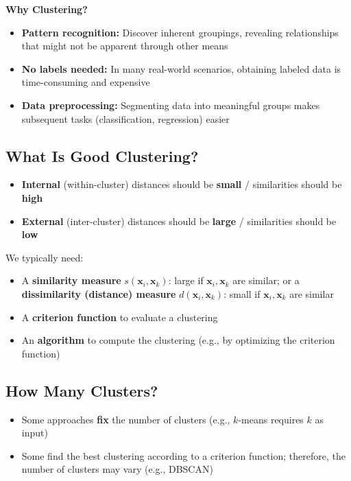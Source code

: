 \documentclass[11pt,a4paper]{article}
\theoremstyle{definition}
\theoremstyle{plain}
\theoremstyle{remark}
\begin{document}
\textbf{Why Clustering?}
\begin{itemize}
    \item \textbf{Pattern recognition:} Discover inherent groupings, revealing relationships that might not be apparent through other means
    \item \textbf{No labels needed:} In many real-world scenarios, obtaining labeled data is time-consuming and expensive
    \item \textbf{Data preprocessing:} Segmenting data into meaningful groups makes subsequent tasks (classification, regression) easier
\end{itemize}

\subsection{What Is Good Clustering?}

\begin{tcolorbox}[colback=green!5!white,colframe=green!75!black,title=\textbf{Good Clustering Criteria}]
\begin{itemize}
    \item \textbf{Internal} (within-cluster) distances should be \textbf{small} / similarities should be \textbf{high}
    \item \textbf{External} (inter-cluster) distances should be \textbf{large} / similarities should be \textbf{low}
\end{itemize}
We typically need:
\begin{itemize}
    \item A \textbf{similarity measure} $s(\mathbf{x}_i, \mathbf{x}_k)$: large if $\mathbf{x}_i, \mathbf{x}_k$ are similar; or a \textbf{dissimilarity (distance) measure} $d(\mathbf{x}_i, \mathbf{x}_k)$: small if $\mathbf{x}_i, \mathbf{x}_k$ are similar
    \item A \textbf{criterion function} to evaluate a clustering
    \item An \textbf{algorithm} to compute the clustering (e.g., by optimizing the criterion function)
\end{itemize}
\end{tcolorbox}

\subsection{How Many Clusters?}

\begin{itemize}
    \item Some approaches \textbf{fix} the number of clusters (e.g., $k$-means requires $k$ as input)
    \item Some find the best clustering according to a criterion function; therefore, the number of clusters may vary (e.g., DBSCAN)
\end{itemize}
\end{document}
